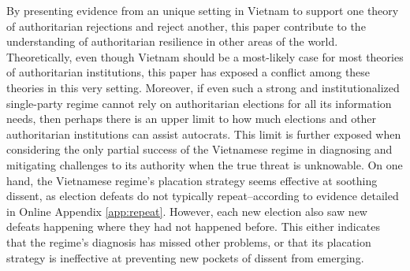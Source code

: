 \documentclass[12pt]{article}
\newcommand{\1}{\mathbbm{1}}
\begin{document}


By presenting evidence from an unique setting in Vietnam to support one theory of authoritarian rejections and reject another, this paper contribute to the understanding of authoritarian resilience in other areas of the world. Theoretically, even though Vietnam should be a most-likely case for most theories of authoritarian institutions, this paper has exposed a conflict among these theories in this very setting. Moreover, if even such a strong and institutionalized single-party regime cannot rely on authoritarian elections for all its information needs, then perhaps there is an upper limit to how much elections and other authoritarian institutions can assist autocrats. This limit is further exposed when considering the only partial success of the Vietnamese regime in diagnosing and mitigating challenges to its authority when the true threat is unknowable. On one hand, the Vietnamese regime's placation strategy seems effective at soothing dissent, as election defeats do not typically repeat--according to evidence detailed in Online Appendix \ref{app:repeat}. However, each new election also saw new defeats happening where they had not happened before. This either indicates that the regime's diagnosis has missed other problems, or that its placation strategy is ineffective at preventing new pockets of dissent from emerging.

\end{document}
